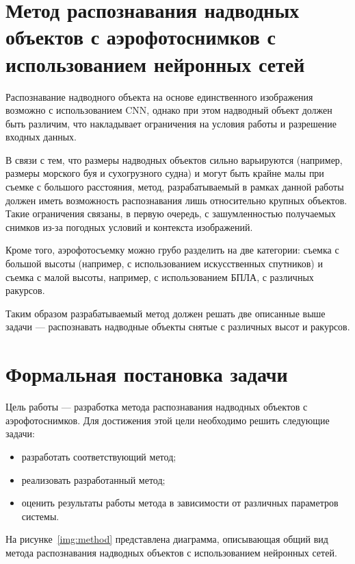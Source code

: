 \section{Метод распознавания надводных объектов с аэрофотоснимков с использованием нейронных сетей}

Распознавание надводного объекта на основе единственного изображения возможно с использованием CNN, однако при этом надводный объект должен быть различим, что накладывает ограничения на условия работы и разрешение входных данных.

В связи с тем, что размеры надводных объектов сильно варьируются (например, размеры морского буя и сухогрузного судна) и могут быть крайне малы при съемке с большого расстояния, метод, разрабатываемый в рамках данной работы должен иметь возможность распознавания лишь относительно крупных объектов. Такие ограничения связаны, в первую очередь, с зашумленностью получаемых снимков из-за погодных условий и контекста изображений.

Кроме того, аэрофотосъемку можно грубо разделить на две категории: съемка с большой высоты (например, с использованием искусственных спутников) и съемка с малой высоты, например, с использованием БПЛА, с различных ракурсов.

Таким образом разрабатываемый метод должен решать две описанные выше задачи --- распознавать надводные объекты снятые с различных высот и ракурсов.

\section{Формальная постановка задачи}

Цель работы --- разработка метода распознавания надводных объектов с аэрофотоснимков. Для достижения этой цели необходимо решить следующие задачи:
\begin{itemize}[label=---]
    \item разработать соответствующий метод;
    \item реализовать разработанный метод;
    \item оценить результаты работы метода в зависимости от различных параметров системы.
\end{itemize}

На рисунке~\ref{img:method} представлена диаграмма, описывающая общий вид метода распознавания надводных объектов с использованием нейронных сетей.


